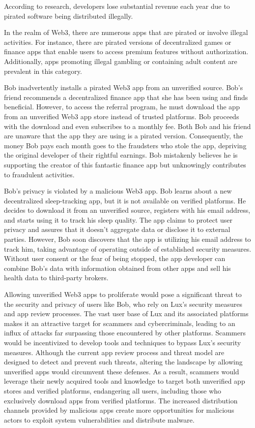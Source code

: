\documentclass[11pt]{article}
\begin{document}
According to research, developers lose substantial revenue each year due to pirated software being distributed illegally.


In the realm of Web3, there are numerous apps that are pirated or involve illegal activities. For instance, there are pirated versions of decentralized games or finance apps that enable users to access premium features without authorization. Additionally, apps promoting illegal gambling or containing adult content are prevalent in this category.


Bob inadvertently installs a pirated Web3 app from an unverified source. Bob's friend recommends a decentralized finance app that she has been using and finds beneficial. However, to access the referral program, he must download the app from an unverified Web3 app store instead of trusted platforms. Bob proceeds with the download and even subscribes to a monthly fee. Both Bob and his friend are unaware that the app they are using is a pirated version. Consequently, the money Bob pays each month goes to the fraudsters who stole the app, depriving the original developer of their rightful earnings. Bob mistakenly believes he is supporting the creator of this fantastic finance app but unknowingly contributes to fraudulent activities.


Bob's privacy is violated by a malicious Web3 app. Bob learns about a new decentralized sleep-tracking app, but it is not available on verified platforms. He decides to download it from an unverified source, registers with his email address, and starts using it to track his sleep quality. The app claims to protect user privacy and assures that it doesn't aggregate data or disclose it to external parties. However, Bob soon discovers that the app is utilizing his email address to track him, taking advantage of operating outside of established security measures. Without user consent or the fear of being stopped, the app developer can combine Bob's data with information obtained from other apps and sell his health data to third-party brokers.


Allowing unverified Web3 apps to proliferate would pose a significant threat to the security and privacy of users like Bob, who rely on Lux's security measures and app review processes. The vast user base of Lux and its associated platforms makes it an attractive target for scammers and cybercriminals, leading to an influx of attacks far surpassing those encountered by other platforms. Scammers would be incentivized to develop tools and techniques to bypass Lux's security measures. Although the current app review process and threat model are designed to detect and prevent such threats, altering the landscape by allowing unverified apps would circumvent these defenses. As a result, scammers would leverage their newly acquired tools and knowledge to target both unverified app stores and verified platforms, endangering all users, including those who exclusively download apps from verified platforms. The increased distribution channels provided by malicious apps create more opportunities for malicious actors to exploit system vulnerabilities and distribute malware.
\end{document}
